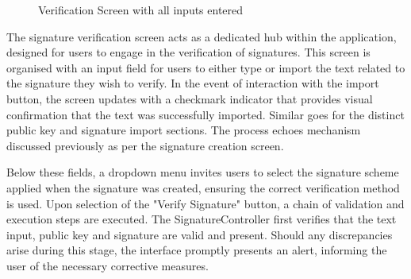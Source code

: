\documentclass[]{final_report}
\theoremstyle{definition}
\begin{document}
\begin{figure}[H]
\begin{minipage}{0.49\textwidth}
        \caption{Verification Screen with all inputs entered}
        \label{fig:image2}
    \end{minipage}
\end{figure}

The signature verification screen acts as a dedicated hub within the application, designed for users to engage in the verification of signatures. This screen is organised with an input field for users to either type or import the text related to the signature they wish to verify. In the event of interaction with the import button, the screen updates with a checkmark indicator that provides visual confirmation that the text was successfully imported. Similar goes for the distinct public key and signature import sections. The process echoes mechanism discussed previously as per the signature creation screen.

Below these fields, a dropdown menu invites users to select the signature scheme applied when the signature was created, ensuring the correct verification method is used.
Upon selection of the "Verify Signature" button, a chain of validation and execution steps are executed. The SignatureController first verifies that the text input, public key and signature are valid and present. Should any discrepancies arise during this stage, the interface promptly presents an alert, informing the user of the necessary corrective measures.
\end{document}
